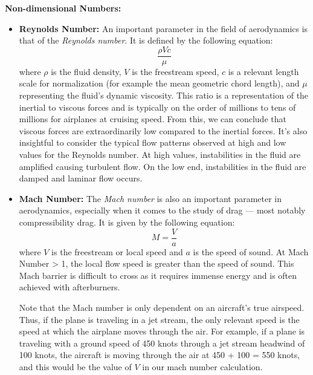 \documentclass{report}
\begin{document}
\textbf{Non-dimensional Numbers:}
\begin{itemize}
    \item[] \textbf{Reynolds Number:} An important parameter in the field of aerodynamics is that of the \textit{Reynolds number}. It is defined by the following equation:
        \begin{equation}
            \frac{\rho V c}{\mu}
        \end{equation}
        where $\rho$ is the fluid density, $V$ is the freestream speed, $c$ is a relevant length scale for normalization (for example the mean geometric chord length), and $\mu$ representing the fluid's dynamic viscosity.
        This ratio is a representation of the inertial to viscous forces and is typically on the order of millions to tens of millions for airplanes at cruising speed. From this, we can conclude that viscous forces are extraordinarily low compared to the inertial forces.
        It's also insightful to consider the typical flow patterns observed at high and low values for the Reynolds number. At high values, instabilities in the fluid are amplified causing turbulent flow. On the low end, instabilities in the fluid are damped and laminar flow occurs.
    \item[] \textbf{Mach Number:} The \textit{Mach number} is also an important parameter in aerodynamics, especially when it comes to the study of drag --- most notably compressibility drag.
    It is given by the following equation:
    \begin{equation}
    M = \frac{V}{a}
    \end{equation}
    where $V$ is the freestream or local speed and $a$ is the speed of sound. At Mach Number > 1, the local flow speed is greater than the speed of sound. This Mach barrier is difficult to cross as it requires immense energy
    and is often achieved with afterburners. 

    Note that the Mach number is only dependent on an aircraft's true airspeed. Thus, if the plane is traveling in a jet stream, the only relevant speed is the speed at which the airplane moves through the air. For example, if a plane is traveling with a ground speed of 450 knots through a jet stream headwind of 100 knots, the aircraft is moving through the air at 450 + 100 = 550 knots, and this would be the value of $V$ in our mach number calculation. 


\end{itemize}
\end{document}

